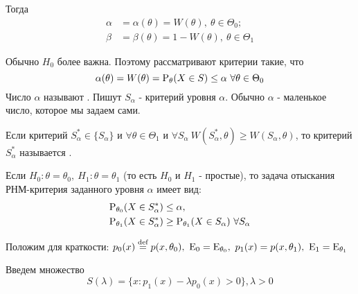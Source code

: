 Тогда
\begin{align*}
    \alpha &= \alpha(\theta) = W(\theta),\ \theta\in\Theta_0; \\
    \beta  &= \beta(\theta) = 1 - W(\theta),\ \theta\in\Theta_1
\end{align*}

\begin{definition}
Обычно \(H_0\) более важна. Поэтому рассматривают критерии
такие, что
\[\alpha(\theta) = W(\theta) = \P_{\theta}(X\in S) \leq\alpha \ \forall \theta\in\Theta_0\]
    Число \(\alpha\) называют .
    Пишут \(S_\alpha\) - критерий уровня \(\alpha\). Обычно \(\alpha\) -
    маленькое число, которое мы задаем сами.
\end{definition}

\begin{definition}
    Если критерий \(S^*_\alpha \in \{S_\alpha\}\) и \(\forall\theta\in\Theta_1\) и
    \(\forall S_\alpha \ W(S^*_\alpha,\theta) \geq W(S_\alpha, \theta)\),
    то критерий \(S^*_\alpha\) называется .
\end{definition}

Если \(H_0:\theta = \theta_0,\ H_1:\theta = \theta_1\) (то есть
\(H_0\) и \(H_1\) - простые), то задача отыскания РНМ-критерия
заданного уровня \(\alpha\) имеет вид:
\begin{align*}
  \P_{\theta_0}(X\in S^*_\alpha) &\leq \alpha, \\
  \P_{\theta_1}(X\in S^*_\alpha) &\geq \P_{\theta_1}(X\in S_\alpha) \ \forall S_\alpha
\end{align*}

Положим для краткости:
\(p_0(x)\defeq p(x, \theta_0),\ \E_0 = \E_{\theta_0},\ p_{1}(x) = p(x, \theta_1),\ \E_1 = \E_{\theta_1}\)

Введем множество
\[S(\lambda) = \{x: p_1(x) - \lambda p_0(x) > 0\}, \lambda > 0\]

